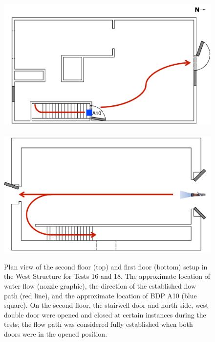 \documentclass[12pt,oneside]{book}
\begin{document}
\begin{figure}[!ht]
	\includegraphics[width=\columnwidth]{../Figures/Floor_Plans/Specific_Tests/West_Hose_Test_2nd_Floor_Annotated}
	\\~\\
	\includegraphics[width=\columnwidth]{../Figures/Floor_Plans/Specific_Tests/West_Hose_Test_18_1st_Floor_Annotated}
	\caption[Plan view of the West Structure setup for Tests 16 and 18.]{Plan view of the second floor (top) and first floor (bottom) setup in the West Structure for Tests 16 and 18. The approximate location of water flow (nozzle graphic), the direction of the established flow path (red line), and the approximate location of BDP A10 (blue square). On the second floor, the stairwell door and north side, west double door were opened and closed at certain instances during the tests; the flow path was considered fully established when both doors were in the opened position.}
	\label{fig:flow_path_1}
\end{figure}
\end{document}
